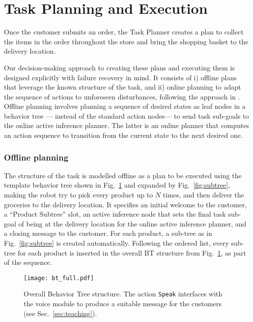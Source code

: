 \section{Task Planning and Execution}
\label{sec:decision_making}

Once the customer submits an order, the Task Planner creates
a plan to collect the items in the order throughout the store and bring the shopping basket to the delivery location.

Our decision-making approach to creating these plans and executing them is designed explicitly with failure recovery in mind. It consists of i) offline plans that leverage the known structure of the task, and ii) online planning to adapt the sequence of actions to unforeseen disturbances, following the approach in \cite{pezzato2023active}. Offline planning involves planning a sequence of desired states as leaf nodes in a behavior tree --- instead of the standard action nodes--- to send task sub-goals to the online active inference planner. The latter is an online planner that computes an action sequence to transition from the current state to the next desired one.

\subsubsection{Offline planning}

The structure of the task is modelled offline as a plan to be executed using the template behavior tree shown in Fig.~\ref{fig:bt_full} and expanded by Fig.~\ref{fig:subtree}, making the robot try to pick every product up to $N$ times, and then deliver the groceries to the delivery location.
It specifies an initial welcome to the customer, a ``Product Subtree'' slot, an active inference node that sets the final task sub-goal of being at the delivery location for the online active inference planner, and a closing message to the customer.  For each product, a sub-tree as in Fig.~\ref{fig:subtree} is created automatically. Following the ordered list, every sub-tree for each product is inserted in the overall BT structure from Fig.~\ref{fig:bt_full}, as part of the sequence.


\begin{figure}[b!]
    \centering
    \texttt{[image: bt\_full.pdf]}
    \caption{Overall Behavior Tree structure. The action \texttt{Speak{}} interfaces with the voice module to produce a suitable message for the customers (see Sec.~\ref{sec:teaching}).}
    \label{fig:bt_full}
\end{figure}



